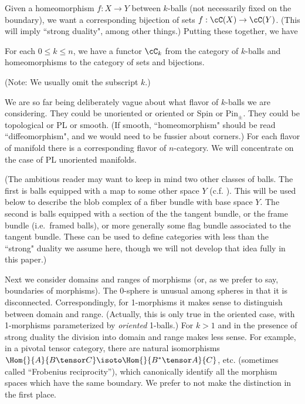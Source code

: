 Given a homeomorphism $f:X\to Y$ between $k$-balls (not necessarily fixed on 
the boundary), we want a corresponding
bijection of sets $f:\cC(X)\to \cC(Y)$.
(This will imply ``strong duality", among other things.) Putting these together, we have

\begin{axiom}[Morphisms]
\label{axiom:morphisms}
For each $0 \le k \le n$, we have a functor $\cC_k$ from 
the category of $k$-balls and 
homeomorphisms to the category of sets and bijections.
\end{axiom}


(Note: We usually omit the subscript $k$.)

We are so far  being deliberately vague about what flavor of $k$-balls
we are considering.
They could be unoriented or oriented or Spin or $\mbox{Pin}_\pm$.
They could be topological or PL or smooth.
(If smooth, ``homeomorphism" should be read ``diffeomorphism", and we would need
to be fussier about corners.)
For each flavor of manifold there is a corresponding flavor of $n$-category.
We will concentrate on the case of PL unoriented manifolds.

(The ambitious reader may want to keep in mind two other classes of balls.
The first is balls equipped with a map to some other space $Y$ (c.f. \cite{MR2079378}). 
This will be used below to describe the blob complex of a fiber bundle with
base space $Y$.
The second is balls equipped with a section of the the tangent bundle, or the frame
bundle (i.e.\ framed balls), or more generally some flag bundle associated to the tangent bundle.
These can be used to define categories with less than the ``strong" duality we assume here,
though we will not develop that idea fully in this paper.)

Next we consider domains and ranges of morphisms (or, as we prefer to say, boundaries
of morphisms).
The 0-sphere is unusual among spheres in that it is disconnected.
Correspondingly, for 1-morphisms it makes sense to distinguish between domain and range.
(Actually, this is only true in the oriented case, with 1-morphisms parameterized
by {\it oriented} 1-balls.)
For $k>1$ and in the presence of strong duality the division into domain and range makes less sense.
For example, in a pivotal tensor category, there are natural isomorphisms $\Hom{}{A}{B \tensor C} \isoto \Hom{}{B^* \tensor A}{C}$, etc. 
(sometimes called ``Frobenius reciprocity''), which canonically identify all the morphism spaces which have the same boundary.
We prefer to not make the distinction in the first place.

